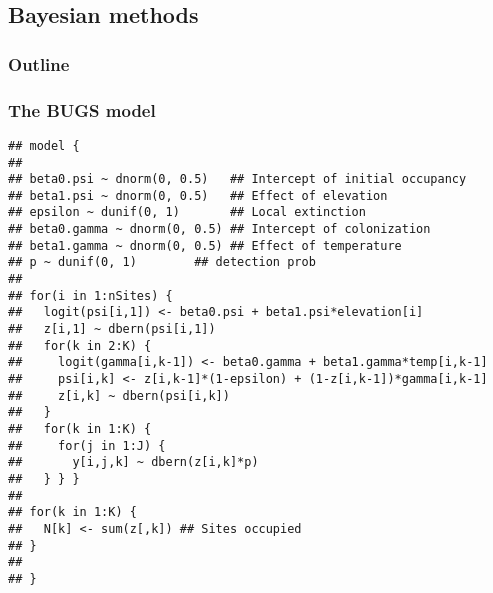 \documentclass[color=usenames,dvipsnames]{beamer}\usepackage[]{graphicx}\usepackage[]{color}
\makeatletter
\newenvironment{kframe}{%
 \def\at@end@of@kframe{}%
 \ifinner\ifhmode%
  \def\at@end@of@kframe{\end{minipage}}%
  \begin{minipage}{\columnwidth}%
 \fi\fi%
 \def\FrameCommand##1{\hskip\@totalleftmargin \hskip-\fboxsep
 \colorbox{shadecolor}{##1}\hskip-\fboxsep
     \hskip-\linewidth \hskip-\@totalleftmargin \hskip\columnwidth}%
 \MakeFramed {\advance\hsize-\width
   \@totalleftmargin\z@ \linewidth\hsize
   \@setminipage}}%
 {\par\unskip\endMakeFramed%
 \at@end@of@kframe}
\newenvironment{knitrout}{}{} %
\makeatother
\begin{document}
\subsection{Bayesian methods}



\begin{frame}
  \frametitle{Outline}
  \Large
\end{frame}




\begin{frame}[fragile]
  \frametitle{The BUGS model}
\begin{knitrout}\scriptsize
{}\color{fgcolor}\begin{kframe}
\begin{verbatim}
## model {
## 
## beta0.psi ~ dnorm(0, 0.5)   ## Intercept of initial occupancy
## beta1.psi ~ dnorm(0, 0.5)   ## Effect of elevation
## epsilon ~ dunif(0, 1)       ## Local extinction
## beta0.gamma ~ dnorm(0, 0.5) ## Intercept of colonization
## beta1.gamma ~ dnorm(0, 0.5) ## Effect of temperature
## p ~ dunif(0, 1)        ## detection prob
## 
## for(i in 1:nSites) {
##   logit(psi[i,1]) <- beta0.psi + beta1.psi*elevation[i]
##   z[i,1] ~ dbern(psi[i,1])
##   for(k in 2:K) {
##     logit(gamma[i,k-1]) <- beta0.gamma + beta1.gamma*temp[i,k-1]
##     psi[i,k] <- z[i,k-1]*(1-epsilon) + (1-z[i,k-1])*gamma[i,k-1]
##     z[i,k] ~ dbern(psi[i,k])
##   }
##   for(k in 1:K) {
##     for(j in 1:J) {
##       y[i,j,k] ~ dbern(z[i,k]*p)
##   } } }
## 
## for(k in 1:K) {
##   N[k] <- sum(z[,k]) ## Sites occupied
## }
## 
## }
\end{verbatim}
\end{kframe}
\end{knitrout}
\end{frame}
\end{document}
